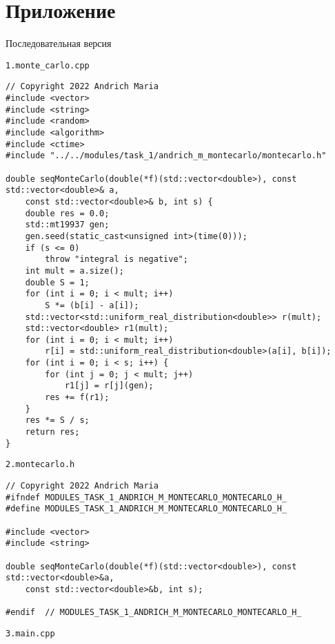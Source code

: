 \documentclass{report}
\begin{document}
\section*{Приложение}
\par Последовательная версия
\par \verb|1.monte_carlo.cpp|
\begin{lstlisting}
// Copyright 2022 Andrich Maria
#include <vector>
#include <string>
#include <random>
#include <algorithm>
#include <ctime>
#include "../../modules/task_1/andrich_m_montecarlo/montecarlo.h"

double seqMonteCarlo(double(*f)(std::vector<double>), const std::vector<double>& a,
    const std::vector<double>& b, int s) {
    double res = 0.0;
    std::mt19937 gen;
    gen.seed(static_cast<unsigned int>(time(0)));
    if (s <= 0)
        throw "integral is negative";
    int mult = a.size();
    double S = 1;
    for (int i = 0; i < mult; i++)
        S *= (b[i] - a[i]);
    std::vector<std::uniform_real_distribution<double>> r(mult);
    std::vector<double> r1(mult);
    for (int i = 0; i < mult; i++)
        r[i] = std::uniform_real_distribution<double>(a[i], b[i]);
    for (int i = 0; i < s; i++) {
        for (int j = 0; j < mult; j++)
            r1[j] = r[j](gen);
        res += f(r1);
    }
    res *= S / s;
    return res;
}
\end{lstlisting}
\par \verb|2.montecarlo.h|
\begin{lstlisting}
// Copyright 2022 Andrich Maria
#ifndef MODULES_TASK_1_ANDRICH_M_MONTECARLO_MONTECARLO_H_
#define MODULES_TASK_1_ANDRICH_M_MONTECARLO_MONTECARLO_H_

#include <vector>
#include <string>

double seqMonteCarlo(double(*f)(std::vector<double>), const std::vector<double>&a,
    const std::vector<double>&b, int s);

#endif  // MODULES_TASK_1_ANDRICH_M_MONTECARLO_MONTECARLO_H_
\end{lstlisting}
\par \verb|3.main.cpp|
\end{document}
